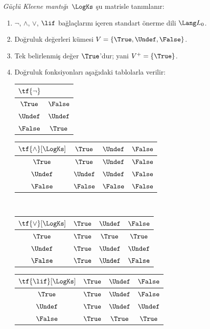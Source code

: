 \documentclass[../../../include/open-logic-section]{subfiles}
\begin{document}
\begin{defn}
\emph{Güçlü Kleene mantığı}~$\LogKs$ şu matrisle tanımlanır:
\begin{enumerate}
  \item $\lnot$, $\land$, $\lor$, $\lif$ bağlaçlarını içeren standart
  önerme dili $\Lang L_0$.
  \item Doğruluk değerleri kümesi $V = \{\True, \Undef, \False\}$.
  \item Tek belirlenmiş değer $\True$'dur; yani $V^+ = \{\True\}$.
  \item Doğruluk fonksiyonları aşağıdaki tablolarla verilir:
  \begin{center}
    \begin{tabular}{c|c} 
      $\tf{\lnot}$ & \\ 
      \hline  
      $\True$ & $\False$ \\ 
      $\Undef$ & $\Undef$ \\
      $\False$ & $\True$ 
    \end{tabular}
    \quad
    \begin{tabular}{c|ccc} 
      $\tf{\land}[\LogKs]$ & $\True$ & $\Undef$ & $\False$ \\ 
      \hline 
      $\True$ & $\True$ & $\Undef$ & $\False$ \\ 
      $\Undef$ & $\Undef$ & $\Undef$ & $\False$\\ 
      $\False$ & $\False$ & $\False$ & $\False$ 
    \end{tabular}
    \\[2ex]
    \begin{tabular}{c|ccc} 
      $\tf{\lor}[\LogKs]$ & $\True$ & $\Undef$ & $\False$ \\ 
      \hline 
      $\True$ & $\True$ & $\True$ & $\True$ \\ 
      $\Undef$ & $\True$ & $\Undef$ & $\Undef$ \\
      $\False$ & $\True$ & $\Undef$ & $\False$ 
    \end{tabular}
    \quad
    \begin{tabular}{c|ccc} 
      $\tf{\lif}[\LogKs]$ & $\True$ & $\Undef$ & $\False$ \\ 
      \hline 
      $\True$ & $\True$ & $\Undef$ & $\False$ \\ 
      $\Undef$ & $\True$ & $\Undef$ & $\Undef$  \\ 
      $\False$ & $\True$ & $\True$ & $\True$ 
    \end{tabular}
  \end{center} 
\end{enumerate}
\end{defn}
\end{document}
